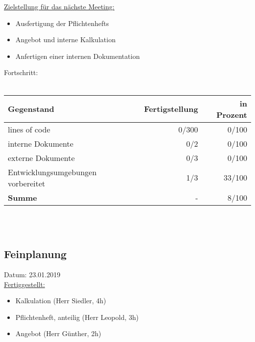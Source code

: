\documentclass[12pt]{article}
\begin{document}
\uline{Zielstellung für das nächste Meeting:}
\begin{itemize}\itemsep0em
\item Ausfertigung der Pflichtenhefts
\item Angebot und interne Kalkulation
\item Anfertigen einer internen Dokumentation \\
\end{itemize}





Fortschritt:\\\\
\begin{tabularx}{\textwidth}{|X|r|r|} \hline
\textbf{Gegenstand}&\textbf{Fertigstellung} & \textbf{in Prozent}\\ \hline
lines of code & 0/300  & 0/100\\ \hline
interne Dokumente & 0/2 & 0/100  \\ \hline
externe Dokumente & 0/3 & 0/100 \\ \hline
Entwicklungsumgebungen vorbereitet & 1/3 & 33/100 \\ \hline
\textbf{Summe} & - & 8/100  \\ \hline
\end{tabularx}\\\\
\newpage

\subsection{Feinplanung}
Datum: 23.01.2019 \\

\uline{Fertiggestellt:}
\begin{itemize}\itemsep0em
\item Kalkulation (Herr Siedler, 4h)
\item Pflichtenheft, anteilig (Herr Leopold, 3h)
\item Angebot (Herr Günther, 2h)\\
\end{itemize}
\end{document}
